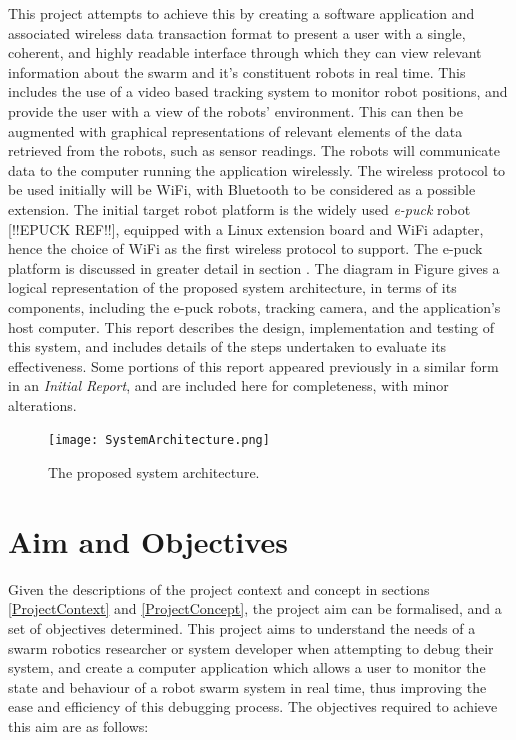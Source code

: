 This project attempts to achieve this by creating a software application and associated wireless data transaction format to present a user with a single, coherent, and highly readable interface through which they can view relevant information about the swarm and it's constituent robots in real time. This includes the use of a video based tracking system to monitor robot positions, and provide the user with a view of the robots' environment. This can then be augmented with graphical representations of relevant elements of the data retrieved from the robots, such as sensor readings. The robots will communicate data to the computer running the application wirelessly. The wireless protocol to be used initially will be WiFi, with Bluetooth to be considered as a possible extension. The initial target robot platform is the widely used \textit{e-puck} robot [!!EPUCK REF!!], equipped with a Linux extension board and WiFi adapter, hence the choice of WiFi as the first wireless protocol to support. The e-puck platform is discussed in greater detail in section . The diagram in Figure  gives a logical representation of the proposed system architecture, in terms of its components, including the e-puck robots, tracking camera, and the application's host computer. This report describes the design, implementation and testing of this system, and includes details of the steps undertaken to evaluate its effectiveness. Some portions of this report appeared previously in a similar form in an \textit{Initial Report}, and are included here for completeness, with minor alterations.

\begin{figure}
	\begin{center}
	\texttt{[image: SystemArchitecture.png]}
	\decoRule
	\caption[Proposed system architecture]{The proposed system architecture.}
	\label{fig:SystemArchitecture}
	\end{center}
\end{figure}


\section{Aim and Objectives}
Given the descriptions of the project context and concept in sections \ref{ProjectContext} and \ref{ProjectConcept}, the project aim can be formalised, and a set of objectives determined. This project aims to understand the needs of a swarm robotics researcher or system developer when attempting to debug their system, and create a computer application which allows a user to monitor the state and behaviour of a robot swarm system in real time, thus improving the ease and efficiency of this debugging process. The objectives required to achieve this aim are as follows:

